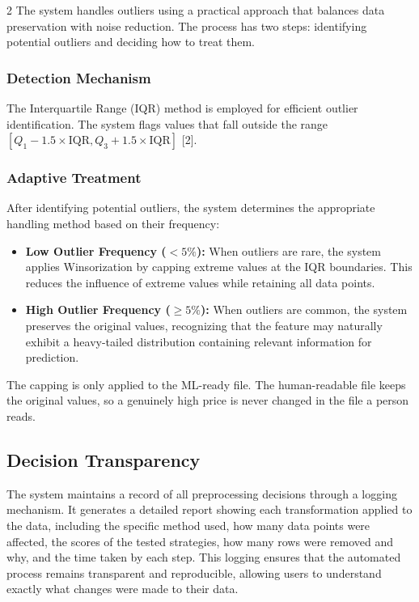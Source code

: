 \documentclass[11pt,a4paper]{article}
\begin{document}
\begin{multicols}{2}
The system handles outliers using a practical approach that balances data preservation with noise reduction. The process has two steps: identifying potential outliers and deciding how to treat them.

\subsubsection{Detection Mechanism}
The Interquartile Range (IQR) method is employed for efficient outlier identification. The system flags values that fall outside the range $[Q_1 - 1.5 \times \text{IQR}, Q_3 + 1.5 \times \text{IQR}]$ [2].

\subsubsection{Adaptive Treatment}
After identifying potential outliers, the system determines the appropriate handling method based on their frequency:

\begin{itemize}
    \item \textbf{Low Outlier Frequency ($< 5\%$):} When outliers are rare, the system applies Winsorization by capping extreme values at the IQR boundaries. This reduces the influence of extreme values while retaining all data points.
    \item \textbf{High Outlier Frequency ($\geq 5\%$):} When outliers are common, the system preserves the original values, recognizing that the feature may naturally exhibit a heavy-tailed distribution containing relevant information for prediction.
\end{itemize}

The capping is only applied to the ML-ready file. The human-readable file keeps the original values, so a genuinely high price is never changed in the file a person reads.


\subsection{Decision Transparency}

The system maintains a record of all preprocessing decisions through a logging mechanism. It generates a detailed report showing each transformation applied to the data, including the specific method used, how many data points were affected, the scores of the tested strategies, how many rows were removed and why, and the time taken by each step. This logging ensures that the automated process remains transparent and reproducible, allowing users to understand exactly what changes were made to their data.


\end{multicols}
\end{document}
